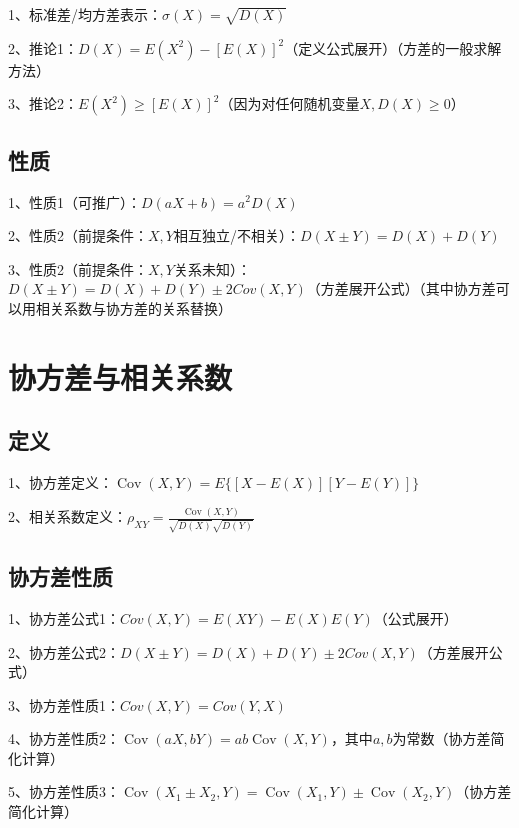 1、标准差/均方差表示：$\sigma(X)=\sqrt{D(X)}$

2、推论1：$D(X)=E\left(X^{2}\right)-[E(X)]^{2}$（定义公式展开）（方差的一般求解方法）

3、推论2：$E\left(X^{2}\right) \geqslant[E(X)]^{2}$（因为对任何随机变量$X, D(X) \geqslant 0$）



\subsection{性质}

1、性质1（可推广）：$D(a X+b)=a^{2} D(X) $

2、性质2（前提条件：$X,Y$相互独立/不相关）：$D(X \pm Y)=D(X)+D(Y)$

3、性质2（前提条件：$X,Y$关系未知）：$D ( X \pm Y ) = D ( X ) + D ( Y ) \pm 2 Cov ( X , Y )  $（方差展开公式）（其中协方差可以用相关系数与协方差的关系替换）

\section{协方差与相关系数}



\subsection{定义}

1、协方差定义：$\operatorname{Cov}(X, Y)=E\{[X-E(X)][Y-E(Y)]\}$

2、相关系数定义：$\rho_{X Y}=\frac{\operatorname{Cov}(X, Y)}{\sqrt{D(X)} \sqrt{D(Y)}}$



\subsection{协方差性质}

1、协方差公式1：$C o v ( X , Y ) = E ( X Y ) - E ( X ) E ( Y ) $（公式展开）

2、协方差公式2：$D ( X \pm Y ) = D ( X ) + D ( Y ) \pm 2 Cov ( X , Y )  $（方差展开公式）

3、协方差性质1：$Cov(X, Y)=Cov(Y, X)$

4、协方差性质2：$\operatorname{Cov}(a X, b Y)=a b \operatorname{Cov}(X, Y)$，其中$a,b$为常数（协方差简化计算）

5、协方差性质3：$\operatorname{Cov}\left(X_{1}\pm X_{2}, Y\right)=\operatorname{Cov}\left(X_{1}, Y\right)\pm \operatorname{Cov}\left(X_{2}, Y\right)$（协方差简化计算）



